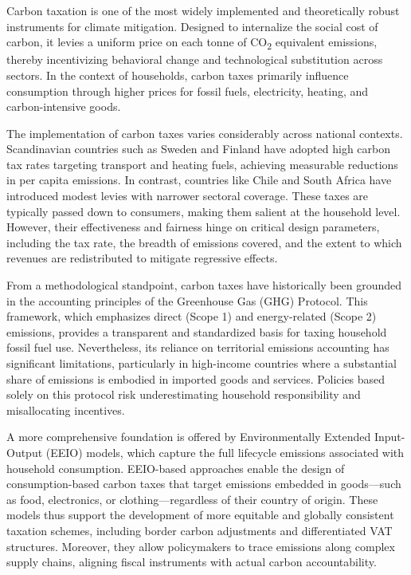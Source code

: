 \documentclass[12pt,a4paper]{article}%
\begin{document}
Carbon taxation is one of the most widely implemented and theoretically robust instruments for climate mitigation. Designed to internalize the social cost of carbon, it levies a uniform price on each tonne of CO\textsubscript{2} equivalent emissions, thereby incentivizing behavioral change and technological substitution across sectors. In the context of households, carbon taxes primarily influence consumption through higher prices for fossil fuels, electricity, heating, and carbon-intensive goods. 

The implementation of carbon taxes varies considerably across national contexts. Scandinavian countries such as Sweden and Finland have adopted high carbon tax rates targeting transport and heating fuels, achieving measurable reductions in per capita emissions. In contrast, countries like Chile and South Africa have introduced modest levies with narrower sectoral coverage. These taxes are typically passed down to consumers, making them salient at the household level. However, their effectiveness and fairness hinge on critical design parameters, including the tax rate, the breadth of emissions covered, and the extent to which revenues are redistributed to mitigate regressive effects.

From a methodological standpoint, carbon taxes have historically been grounded in the accounting principles of the Greenhouse Gas (GHG) Protocol. This framework, which emphasizes direct (Scope 1) and energy-related (Scope 2) emissions, provides a transparent and standardized basis for taxing household fossil fuel use. Nevertheless, its reliance on territorial emissions accounting has significant limitations, particularly in high-income countries where a substantial share of emissions is embodied in imported goods and services. Policies based solely on this protocol risk underestimating household responsibility and misallocating incentives.

A more comprehensive foundation is offered by Environmentally Extended Input-Output (EEIO) models, which capture the full lifecycle emissions associated with household consumption. EEIO-based approaches enable the design of consumption-based carbon taxes that target emissions embedded in goods—such as food, electronics, or clothing—regardless of their country of origin. These models thus support the development of more equitable and globally consistent taxation schemes, including border carbon adjustments and differentiated VAT structures. Moreover, they allow policymakers to trace emissions along complex supply chains, aligning fiscal instruments with actual carbon accountability.
\end{document}
